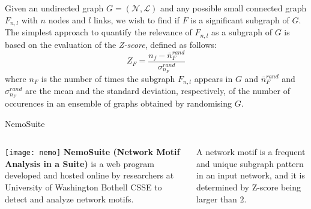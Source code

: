 \begin{frame}
Given an undirected graph $G=(\mathcal{N},\mathcal{L})$ and any possible small connected graph $F_{n,l}$ with $n$ nodes and $l$ links, we wish to find if $F$ is a significant subgraph of $G$. \\
The simplest approach to quantify the relevance of $F_{n,l}$ as a subgraph of $G$ is based on the evaluation of the {\it Z-score}, defined as follows:
\begin{equation}
Z_F = \frac{n_f - \bar{n}^{rand}_F}{\sigma_{n_F}^{rand}}
\end{equation}
where $n_F$ is the number of times the subgraph $F_{n,l}$ appears in $G$ and $\bar{n}^{rand}_F$ and $\sigma_{n_F}^{rand}$ are the mean and the standard deviation, respectively, of the number of occurences in an ensemble of graphs obtained by randomising $G$.\par 
\end{frame}


\begin{frame}{NemoSuite}
\begin{columns}
             \centering
             \texttt{[image: nemo]}
              \textbf{NemoSuite (Network Motif Analysis in a Suite)}
                is a web program developed and hosted online by researchers at University of Washington Bothell CSSE to detect and analyze network motifs.\par 
                \vspace{5mm}
                
                A network motif is a frequent and unique subgraph
pattern in an input network, and it is determined by Z-score being larger than $2$.
                
	
         \end{columns} 

\end{frame}


